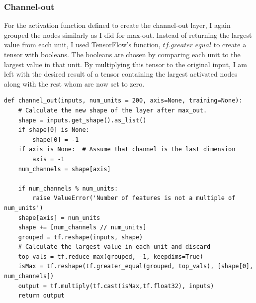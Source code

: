\subsubsection*{Channel-out}
For the activation function defined to create the channel-out layer, I again grouped
the nodes similarly as I did for max-out. Instead of returning the largest value from each 
unit, I used TensorFlow's function, $tf.greater\_equal$ to create a tensor with booleans. The 
booleans are chosen by comparing each unit to the largest value in that unit. By multiplying 
this tensor to the original input, I am left with the desired result of a tensor containing 
the largest activated nodes along with the rest whom are now set to zero. 
\lstset{style=Python}
\begin{lstlisting}[caption={Python implementation for the custom activation function used to define the channel-out layer.},captionpos=b, label={lst:channel_out}]
def channel_out(inputs, num_units = 200, axis=None, training=None):
    # Calculate the new shape of the layer after max_out.
    shape = inputs.get_shape().as_list()
    if shape[0] is None:
        shape[0] = -1
    if axis is None:  # Assume that channel is the last dimension
        axis = -1
    num_channels = shape[axis]
    
    if num_channels % num_units:
        raise ValueError('Number of features is not a multiple of num_units')
    shape[axis] = num_units
    shape += [num_channels // num_units]
    grouped = tf.reshape(inputs, shape)
    # Calculate the largest value in each unit and discard 
    top_vals = tf.reduce_max(grouped, -1, keepdims=True)
    isMax = tf.reshape(tf.greater_equal(grouped, top_vals), [shape[0], num_channels])
    output = tf.multiply(tf.cast(isMax,tf.float32), inputs)
    return output  
\end{lstlisting}
